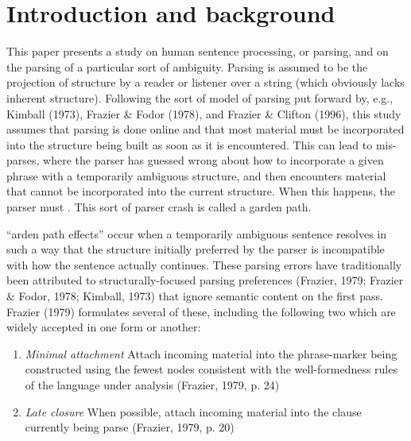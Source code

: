 \documentclass[12pt,oneside]{book}
\begin{document}
\pagebreak


\hypertarget{introduction-and-background}{%
\chapter{Introduction and background}\label{introduction-and-background}}


This paper presents a study on human sentence processing, or parsing, and on the parsing of a particular sort of ambiguity. Parsing is assumed to be the projection of structure by a reader or listener over a string (which obviously lacks inherent structure). Following the sort of model of parsing put forward by, e.g., Kimball (1973), Frazier \& Fodor (1978), and Frazier \& Clifton (1996), this study assumes that parsing is done online and that most material must be incorporated into the structure being built as soon as it is encountered. This can lead to mis-parses, where the parser has guessed wrong about how to incorporate a given phrase with a temporarily ambiguous structure, and then encounters material that cannot be incorporated into the current structure. When this happens, the parser must . This sort of parser crash is  called a garden path.


``arden path effects'' occur when a temporarily ambiguous sentence resolves in such a way that the structure initially preferred by the parser is incompatible with how the sentence actually continues. These parsing errors have traditionally been attributed to structurally-focused parsing preferences (Frazier, 1979; Frazier \& Fodor, 1978; Kimball, 1973) that ignore semantic content on the first pass. Frazier (1979) formulates several of these, including the following two which are widely accepted in one form or another:

\begin{enumerate}
\def\labelenumi{(\arabic{enumi})}
\item
  \emph{Minimal attachment}
  Attach incoming material into the phrase-marker being constructed using the fewest nodes consistent with the well-formedness rules of the language under analysis (Frazier, 1979, p. 24)
\item
  \emph{Late closure}
  When possible, attach incoming material into the clause currently being parse (Frazier, 1979, p. 20)
\end{enumerate}
\end{document}
